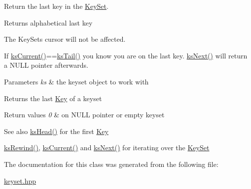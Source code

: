 Return the last key in the \hyperlink{classkdb_1_1KeySet}{Key\+Set}. 

\begin{DoxyReturn}{Returns}
alphabetical last key
\end{DoxyReturn}
The Key\+Sets cursor will not be affected.

If \hyperlink{group__keyset_ga4287b9416912c5f2ab9c195cb74fb094}{ks\+Current()}==\hyperlink{group__keyset_gadca442c4ab43cf532b15091d7711559e}{ks\+Tail()} you know you are on the last key. \hyperlink{group__keyset_ga317321c9065b5a4b3e33fe1c399bcec9}{ks\+Next()} will return a N\+U\+LL pointer afterwards.


\begin{DoxyParams}{Parameters}
{\em ks} & the keyset object to work with \\
\hline
\end{DoxyParams}
\begin{DoxyReturn}{Returns}
the last \hyperlink{classkdb_1_1Key}{Key} of a keyset 
\end{DoxyReturn}

\begin{DoxyRetVals}{Return values}
{\em 0} & on N\+U\+LL pointer or empty keyset \\
\hline
\end{DoxyRetVals}
\begin{DoxySeeAlso}{See also}
\hyperlink{group__keyset_gae7dbf3aef70e67b5328475eb3d1f92f5}{ks\+Head()} for the first \hyperlink{group__key}{Key} 

\hyperlink{group__keyset_gabe793ff51f1728e3429c84a8a9086b70}{ks\+Rewind()}, \hyperlink{group__keyset_ga4287b9416912c5f2ab9c195cb74fb094}{ks\+Current()} and \hyperlink{group__keyset_ga317321c9065b5a4b3e33fe1c399bcec9}{ks\+Next()} for iterating over the \hyperlink{group__keyset}{Key\+Set} 
\end{DoxySeeAlso}


The documentation for this class was generated from the following file\+:\begin{DoxyCompactItemize}
\item 
\hyperlink{keyset_8hpp}{keyset.\+hpp}\end{DoxyCompactItemize}
